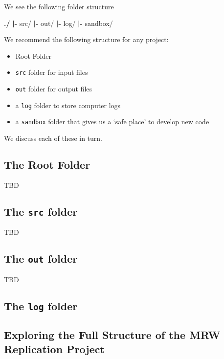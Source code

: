\documentclass[]{book}
\newenvironment{Shaded}{\begin{snugshade}}{\end{snugshade}}
\newcommand{\KeywordTok}[1]{\textcolor[rgb]{0.13,0.29,0.53}{\textbf{{#1}}}}
\newcommand{\NormalTok}[1]{{#1}}
\providecommand{\tightlist}{%
  \setlength{\itemsep}{0pt}\setlength{\parskip}{0pt}}
\theoremstyle{definition}
\theoremstyle{definition}
\theoremstyle{definition}
\theoremstyle{remark}
\begin{document}
We see the following folder structure

\begin{Shaded}
\begin{Highlighting}[]
\KeywordTok{./}
    \KeywordTok{|-} \NormalTok{src/}
    \KeywordTok{|-} \NormalTok{out/}
    \KeywordTok{|-} \NormalTok{log/}
    \KeywordTok{|-} \NormalTok{sandbox/}
\end{Highlighting}
\end{Shaded}

We recommend the following structure for any project:

\begin{itemize}
\tightlist
\item
  Root Folder
\item
  \texttt{src} folder for input files
\item
  \texttt{out} folder for output files
\item
  a \texttt{log} folder to store computer logs
\item
  a \texttt{sandbox} folder that gives us a `safe place' to develop new
  code
\end{itemize}

We discuss each of these in turn.

\subsection{The Root Folder}\label{the-root-folder}

TBD

\subsection{\texorpdfstring{The \texttt{src}
folder}{The src folder}}\label{the-src-folder}

TBD

\subsection{\texorpdfstring{The \texttt{out}
folder}{The out folder}}\label{the-out-folder}

TBD

\subsection{\texorpdfstring{The \texttt{log}
folder}{The log folder}}\label{the-log-folder}

\subsection{Exploring the Full Structure of the MRW Replication
Project}\label{exploring-the-full-structure-of-the-mrw-replication-project}
\end{document}
